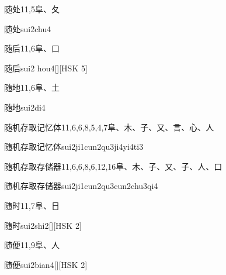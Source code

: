 \begin{entry}{随处}{11,5}{⾩、⼡}
  \begin{phonetics}{随处}{sui2chu4}
  \end{phonetics}
\end{entry}

\begin{entry}{随后}{11,6}{⾩、⼝}
  \begin{phonetics}{随后}{sui2 hou4}[][HSK 5]
  \end{phonetics}
\end{entry}

\begin{entry}{随地}{11,6}{⾩、⼟}
  \begin{phonetics}{随地}{sui2di4}
  \end{phonetics}
\end{entry}

\begin{entry}{随机存取记忆体}{11,6,6,8,5,4,7}{⾩、⽊、⼦、⼜、⾔、⼼、⼈}
  \begin{phonetics}{随机存取记忆体}{sui2ji1cun2qu3ji4yi4ti3}
  \end{phonetics}
\end{entry}

\begin{entry}{随机存取存储器}{11,6,6,8,6,12,16}{⾩、⽊、⼦、⼜、⼦、⼈、⼝}
  \begin{phonetics}{随机存取存储器}{sui2ji1cun2qu3cun2chu3qi4}
  \end{phonetics}
\end{entry}

\begin{entry}{随时}{11,7}{⾩、⽇}
  \begin{phonetics}{随时}{sui2shi2}[][HSK 2]
  \end{phonetics}
\end{entry}

\begin{entry}{随便}{11,9}{⾩、⼈}
  \begin{phonetics}{随便}{sui2bian4}[][HSK 2]
  \end{phonetics}
\end{entry}


